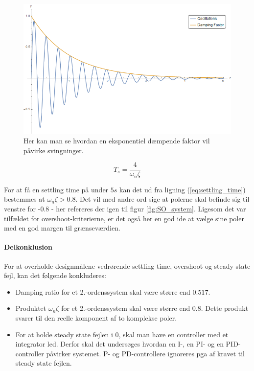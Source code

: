 \begin{figure}[ht]
	\begin{center}
		\includegraphics[scale=0.45]{Billeder/Damped_Oscillations.png}
	\end{center}
\caption{Her kan man se hvordan en eksponentiel dæmpende faktor vil påvirke svingninger.}
\label{fig:Damped_Oscillations}
\end{figure}

\begin{equation}\label{eq:settling_time}
T_{s}=\frac{4}{\omega_{n}\zeta}
\end{equation}

For at få en settling time på under $5s$ kan det ud fra ligning (\ref{eq:settling_time}) bestemmes at $\omega_{n}\zeta > 0.8$. Det vil med andre ord sige at polerne skal befinde sig til venstre for -0.8 - her refereres der igen til figur \ref{fig:SO_system}. Ligesom det var tilfældet for overshoot-kriterierne, er det også her en god ide at vælge sine poler med en god margen til grænseværdien.

\paragraph{Delkonklusion}

For at overholde designmålene vedrørende settling time, overshoot og steady state fejl, kan det følgende konkluderes:

\begin{itemize}
\item Damping ratio for et 2.-ordenssystem skal være større end $0.517$.
\item Produktet $\omega_{n}\zeta$ for et 2.-ordenssystem skal være større end $0.8$. Dette produkt svarer til den reelle komponent af to komplekse poler.
\item For at holde steady state fejlen i 0, skal man have en controller med et integrator led. Derfor skal det undersøges hvordan en I-, en PI- og en PID-controller påvirker systemet. P- og PD-controllere ignoreres pga af kravet til steady state fejlen.
\end{itemize}

